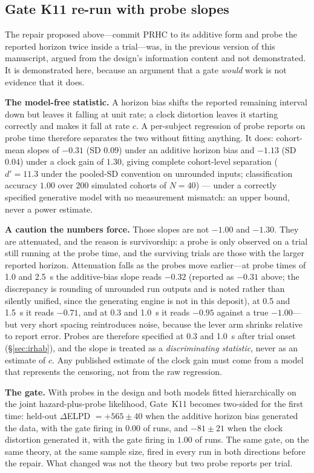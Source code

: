 \documentclass[9pt,twocolumn]{article}
\begin{document}
\subsection{Gate K11 re-run with probe slopes}
\label{sec:k11}
The repair proposed above---commit PRHC to its additive form and probe the reported horizon twice inside a trial---was, in the previous version of this manuscript, argued from the design's information content and not demonstrated. It is demonstrated here, because an argument that a gate \emph{would} work is not evidence that it does.

\textbf{The model-free statistic.} A horizon bias shifts the reported remaining interval down but leaves it falling at unit rate; a clock distortion leaves it starting correctly and makes it fall at rate $c$. A per-subject regression of probe reports on probe time therefore separates the two without fitting anything. It does: cohort-mean slopes of $-0.31$ (SD $0.09$) under an additive horizon bias and $-1.13$ (SD $0.04$) under a clock gain of $1.30$, giving complete cohort-level separation ($d'=11.3$ under the pooled-SD convention on unrounded inputs; classification accuracy $1.00$ over 200 simulated cohorts of $N=40$) --- under a correctly specified generative model with no measurement mismatch: an upper bound, never a power estimate.

\textbf{A caution the numbers force.} Those slopes are not $-1.00$ and $-1.30$. They are attenuated, and the reason is survivorship: a probe is only observed on a trial still running at the probe time, and the surviving trials are those with the larger reported horizon. Attenuation falls as the probes move earlier---at probe times of 1.0 and 2.5~s the additive-bias slope reads $-0.32$ (reported as $-0.31$ above; the discrepancy is rounding of unrounded run outputs and is noted rather than silently unified, since the generating engine is not in this deposit), at 0.5 and 1.5~s it reads $-0.71$, and at 0.3 and 1.0~s it reads $-0.95$ against a true $-1.00$---but very short spacing reintroduces noise, because the lever arm shrinks relative to report error. Probes are therefore specified at 0.3 and 1.0~s after trial onset (\S\ref{sec:irhab}), and the slope is treated as a \emph{discriminating statistic}, never as an estimate of $c$. Any published estimate of the clock gain must come from a model that represents the censoring, not from the raw regression.

\textbf{The gate.} With probes in the design and both models fitted hierarchically on the joint hazard-plus-probe likelihood, Gate~K11 becomes two-sided for the first time: held-out $\Delta$ELPD $=+565\pm40$ when the additive horizon bias generated the data, with the gate firing in $0.00$ of runs, and $-81\pm21$ when the clock distortion generated it, with the gate firing in $1.00$ of runs. The same gate, on the same theory, at the same sample size, fired in every run in both directions before the repair. What changed was not the theory but two probe reports per trial.
\end{document}

